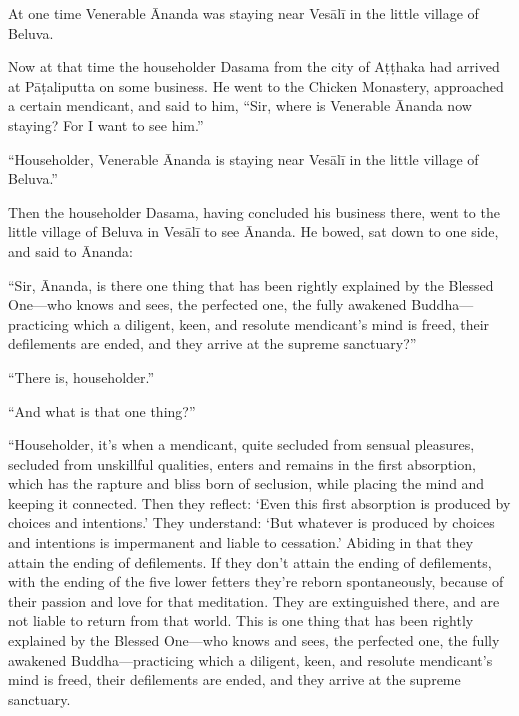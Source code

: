 \documentclass[12pt,openany]{book}%
\begin{document}
At one time Venerable Ānanda was staying near \textsanskrit{Vesālī} in the little village of Beluva. 

Now at that time the householder Dasama from the city of \textsanskrit{Aṭṭhaka} had arrived at \textsanskrit{Pāṭaliputta} on some business. He went to the Chicken Monastery, approached a certain mendicant, and said to him, “Sir, where is Venerable Ānanda now staying? For I want to see him.” 

“Householder, Venerable Ānanda is staying near \textsanskrit{Vesālī} in the little village of Beluva.” 

Then the householder Dasama, having concluded his business there, went to the little village of Beluva in \textsanskrit{Vesālī} to see Ānanda. He bowed, sat down to one side, and said to Ānanda: 

“Sir, Ānanda, is there one thing that has been rightly explained by the Blessed One—who knows and sees, the perfected one, the fully awakened Buddha—practicing which a diligent, keen, and resolute mendicant’s mind is freed, their defilements are ended, and they arrive at the supreme sanctuary?” 

“There is, householder.” 

“And what is that one thing?” 

“Householder, it’s when a mendicant, quite secluded from sensual pleasures, secluded from unskillful qualities, enters and remains in the first absorption, which has the rapture and bliss born of seclusion, while placing the mind and keeping it connected. Then they reflect: ‘Even this first absorption is produced by choices and intentions.’ They understand: ‘But whatever is produced by choices and intentions is impermanent and liable to cessation.’ Abiding in that they attain the ending of defilements. If they don’t attain the ending of defilements, with the ending of the five lower fetters they’re reborn spontaneously, because of their passion and love for that meditation. They are extinguished there, and are not liable to return from that world. This is one thing that has been rightly explained by the Blessed One—who knows and sees, the perfected one, the fully awakened Buddha—practicing which a diligent, keen, and resolute mendicant’s mind is freed, their defilements are ended, and they arrive at the supreme sanctuary. 
\end{document}
